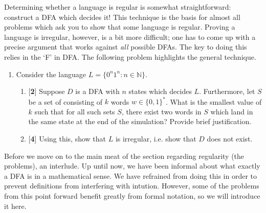 \documentclass[11pt]{article}
\newcounter{enum}
\begin{document}
\par Determining whether a language is regular is somewhat straightforward: construct a DFA which decides it!  This technique is the basis for almost all problems which ask you to show that some language is regular.  Proving a language is irregular, however, is a bit more difficult; one has to come up with a precise argument that works against \textit{all} possible DFAs.  The key to doing this relies in the `F' in DFA.  The following problem highlights the general technique.

\begin{enumerate}
\setcounter{enumi}{\theenum}

\item Consider the language $L=\{0^n1^n:n\in\mathbb{N}\}$.

\begin{enumerate}

\item {[}\textbf{2}{]} Suppose $D$ is a DFA with $n$ states which decides $L$.  Furthermore, let $S$ be a set of consisting of $k$ words $w\in \{0,1\}^*$.  What is the smallest value of $k$ such that for all such sets $S$, there exist two words in $S$ which land in the same state at the end of the simulation?  Provide brief justification.

\item {[}\textbf{4}{]} Using this, show that $L$ is irregular, i.e. show that $D$ does not exist.

\end{enumerate}

\setcounter{enum}{\theenumi}
\end{enumerate}

\par Before we move on to the main meat of the section regarding regularity (the problems), an interlude.  Up until now, we have been informal about what exactly a DFA is in a mathematical sense.  We have refrained from doing this in order to prevent definitions from interfering with intution.  However, some of the problems from this point forward benefit greatly from formal notation, so we will introduce it here.
\end{document}
